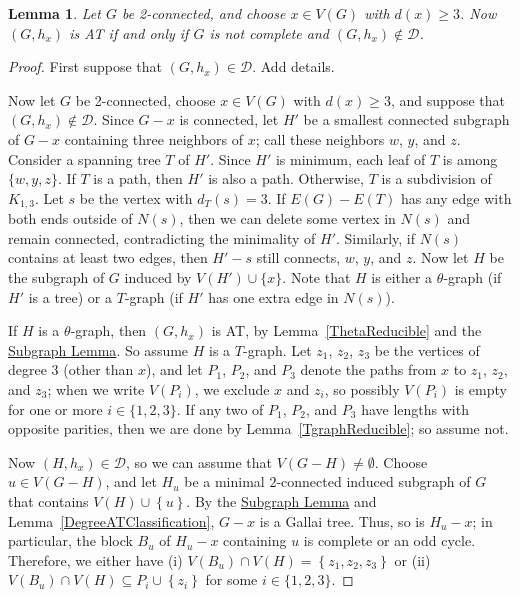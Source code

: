 \documentclass[12pt]{article}
\theoremstyle{plain}
\newtheorem{lem}[thm]{Lemma}
\theoremstyle{definition}
\theoremstyle{remark}
\newcommand{\fancy}[1]{\mathcal{#1}}
\newcommand{\D}{\fancy{D}}
\newcommand{\set}[1]{\left\{ #1 \right\}}
\def\D{\fancy{D}}
\begin{document}
\begin{lem}\label{TwoConnectedClassification}
Let $G$ be 2-connected, and choose $x\in V(G)$ with $d(x)\ge 3$. 
Now $(G,h_x)$ is AT if and only if $G$ is not complete and $(G,h_x) \not \in \D$.
\end{lem}
\begin{proof}
First suppose that $(G,h_x)\in \D$.  Add details.

Now let $G$ be 2-connected, choose $x\in V(G)$ with $d(x)\ge 3$, and suppose that
$(G,h_x)\notin \D$.  Since $G-x$ is connected, let $H'$ be a smallest connected
subgraph of $G-x$ containing three neighbors of $x$; call these neighbors $w$,
$y$, and $z$.  Consider a spanning tree $T$ of $H'$.  Since $H'$ is minimum,
each leaf of $T$ is among $\{w, y, z\}$.  If $T$ is a path, then $H'$ is also a
path.  Otherwise, $T$ is a subdivision of $K_{1,3}$.  Let $s$ be the vertex with
$d_T(s)=3$.  If $E(G)-E(T)$ has any edge with both ends outside of $N(s)$, then
we can delete some vertex in $N(s)$ and remain connected, contradicting the
minimality of $H'$.  Similarly, if $N(s)$ contains at least two edges, then
$H'-s$ still connects, $w$, $y$, and $z$.  Now let $H$ be the subgraph of $G$
induced by $V(H')\cup\{x\}$.  Note that $H$ is either a $\theta$-graph (if $H'$
is a tree) or a $T$-graph (if $H'$ has one extra edge in $N(s)$).  

If $H$ is a $\theta$-graph, then $(G,h_x)$ is AT, by
Lemma~\ref{ThetaReducible} and 
the \hyperref[InducedSubgraph]{Subgraph Lemma}.
So assume $H$ is a $T$-graph.  Let $z_1$, $z_2$, $z_3$ be the vertices
of degree 3 (other than $x$), and let $P_1$, $P_2$, and $P_3$ denote the paths
from $x$ to $z_1$, $z_2$, and $z_3$; when we write $V(P_i)$, we exclude $x$ and
$z_i$, so possibly $V(P_i)$ is empty for one or more $i\in\{1,2,3\}$.
If any two of $P_1$, $P_2$, and $P_3$ have lengths with opposite parities, then
we are done by Lemma~\ref{TgraphReducible}; so assume not.  
	
Now $(H,h_x)\in \D$, so we can assume that $V(G-H) \ne \emptyset$.  Choose $u
\in V(G-H)$, and let $H_u$ be a minimal $2$-connected induced subgraph of $G$
that contains $V(H) \cup \set{u}$.  By the \hyperref[InducedSubgraph]{Subgraph
Lemma} and Lemma~\ref{DegreeATClassification}, $G-x$ is a Gallai tree. 
Thus, so is $H_u-x$; in particular, the block $B_u$ of $H_u-x$ containing $u$
is complete or an odd cycle.  Therefore, we either have (i) $V(B_u) \cap V(H) =
\set{z_1, z_2,z_3}$ or (ii)  $V(B_u) \cap V(H) \subseteq P_i \cup \set{z_i}$
for some $i \in \{1,2,3\}$.
	

\end{proof}
\end{document}
